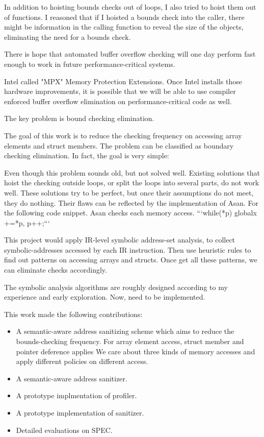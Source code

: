 



In addition to hoisting bounds checks out of loops, I also tried to hoist them out of functions. I reasoned that if I hoisted a bounds check into the caller, there might be information in the calling function to reveal the size of the objects, eliminating the need for a bounds check.


There is hope that automated buffer overflow checking will one day perform fast enough to work in future performance-critical systems.


Intel called "MPX" Memory Protection Extensions. Once Intel installs those hardware improvements, it is possible that we will be able to use compiler enforced buffer overflow elimination on performance-critical code as well.

The key problem is bound checking elimination.


The goal of this work is to reduce the checking frequency on accessing array elements and struct members.
The problem can be classified as boundary checking elimination. In fact, the goal is very simple:

Even though this problem sounds old, but not solved well.
Existing solutions that hoist the checking outside loops, or split the loops into several parts, do not work well.
These solutions try to be perfect, but once their assumptions do not meet, they do nothing.
Their flaws can be reflected by the implementation of Asan.
For the following code snippet. Asan checks each memory access.
```while(*p) {globalx +=*p, p++;}```

This project would apply IR-level symbolic address-set analysis, to collect symbolic-addresses accessed by each IR instruction.
Then use heuristic rules to find out patterns on accessing arrays and structs.
Once get all these patterns, we can eliminate checks accordingly.

The symbolic analysis algorithms are roughly designed according to my experience and early exploration.
Now, need to be implemented.


This work made the following contributions:

\begin{itemize}
  \item A semantic-aware address sanitizing scheme which aims to reduce the bounds-checking frequency.  For array element access, struct member and pointer deference applies We care about three kinds of memory accesses and apply different policies on different access.
  \item A semantic-aware address sanitizer.
  \item A prototype implmentation of profiler.
  \item A prototype implementation of sanitizer.
  \item Detailed evaluations on SPEC.
\end{itemize}


